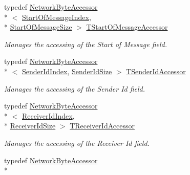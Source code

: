 \begin{DoxyCompactItemize}
typedef \hyperlink{class_terra_swarm_1_1_network_byte_accessor}{Network\-Byte\-Accessor}\\*
$<$ \hyperlink{class_terra_swarm_1_1_message_header_a2a96f83a96cfee0465da982814cb372aa74b66ff4fa355a80faf96e67ce47f679}{Start\-Of\-Message\-Index}, \\*
\hyperlink{class_terra_swarm_1_1_message_header_a189acad5bd9f60fe47b3381da62d3484a66c01670e26436cba7028bb19c238cef}{Start\-Of\-Message\-Size} $>$ \hyperlink{class_terra_swarm_1_1_message_header_a791ee152a9a2709c7479737dfdddfa2f}{T\-Start\-Of\-Message\-Accessor}
\begin{DoxyCompactList}\small\item\em Manages the accessing of the Start of Message field. \end{DoxyCompactList}\item 
typedef \hyperlink{class_terra_swarm_1_1_network_byte_accessor}{Network\-Byte\-Accessor}\\*
$<$ \hyperlink{class_terra_swarm_1_1_message_header_a2a96f83a96cfee0465da982814cb372aa468f5b005cd4374790f76469c53b6708}{Sender\-Id\-Index}, \hyperlink{class_terra_swarm_1_1_message_header_a189acad5bd9f60fe47b3381da62d3484a51b6e5f4bb02d1e98de93c3de237bf3c}{Sender\-Id\-Size} $>$ \hyperlink{class_terra_swarm_1_1_message_header_aa4003ec191b4bf2a4e38cc289bb10e70}{T\-Sender\-Id\-Accessor}
\begin{DoxyCompactList}\small\item\em Manages the accessing of the Sender Id field. \end{DoxyCompactList}\item 
typedef \hyperlink{class_terra_swarm_1_1_network_byte_accessor}{Network\-Byte\-Accessor}\\*
$<$ \hyperlink{class_terra_swarm_1_1_message_header_a2a96f83a96cfee0465da982814cb372aabe5cfb032e70c35d03586a7d16d66490}{Receiver\-Id\-Index}, \\*
\hyperlink{class_terra_swarm_1_1_message_header_a189acad5bd9f60fe47b3381da62d3484aa9ca8b3cb72a1ff173d84c8ca71f96d5}{Receiver\-Id\-Size} $>$ \hyperlink{class_terra_swarm_1_1_message_header_a9725379883f5e9451d235fb4bd1c8ee3}{T\-Receiver\-Id\-Accessor}
\begin{DoxyCompactList}\small\item\em Manages the accessing of the Receiver Id field. \end{DoxyCompactList}\item 
typedef \hyperlink{class_terra_swarm_1_1_network_byte_accessor}{Network\-Byte\-Accessor}\\*

\end{DoxyCompactItemize}
